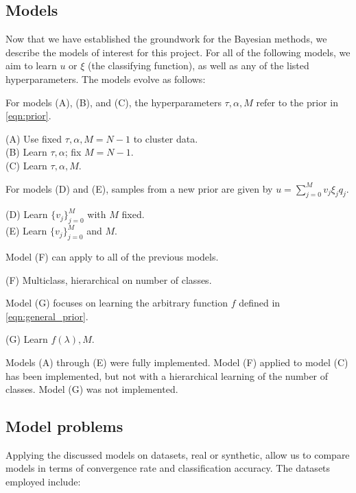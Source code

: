 \documentclass{siamart1116}
\begin{document}
    \subsection{Models}
        Now that we have established the groundwork for the Bayesian methods, we describe the models of interest for this project. For all of the following models, we aim to learn $u$ or $\xi$ (the classifying function), as well as any of the listed hyperparameters. The models evolve as follows:

        For models (A), (B), and (C), the hyperparameters $\tau,\alpha,M$ refer to the prior in \cref{eqn:prior}.

        (A) Use fixed $\tau,\alpha, M=N-1$ to cluster data.\\
        (B) Learn $\tau,\alpha$; fix $M=N-1$.\\
        (C) Learn $\tau,\alpha,M$.

        For models (D) and (E), samples from a new prior are given by $u = \sum_{j=0}^M v_j\xi_j q_j$.

        (D) Learn $\{v_j\}_{j=0}^M$ with $M$ fixed.\\
        (E) Learn $\{v_j\}_{j=0}^M$ and $M$.

        Model (F) can apply to all of the previous models.

        (F) Multiclass, hierarchical on number of classes.

        Model (G) focuses on learning the arbitrary function $f$ defined in \cref{eqn:general_prior}. 

        (G) Learn $f(\lambda), M$.

        Models (A) through (E) were fully implemented. Model (F) applied to model (C) has been implemented, but not with a hierarchical learning of the number of classes. Model (G) was not implemented.

    \subsection{Model problems} \label{sec:model_problems}
        Applying the discussed models on datasets, real or synthetic, allow us to compare models in terms of convergence rate and classification accuracy. The datasets employed include:
\end{document}
